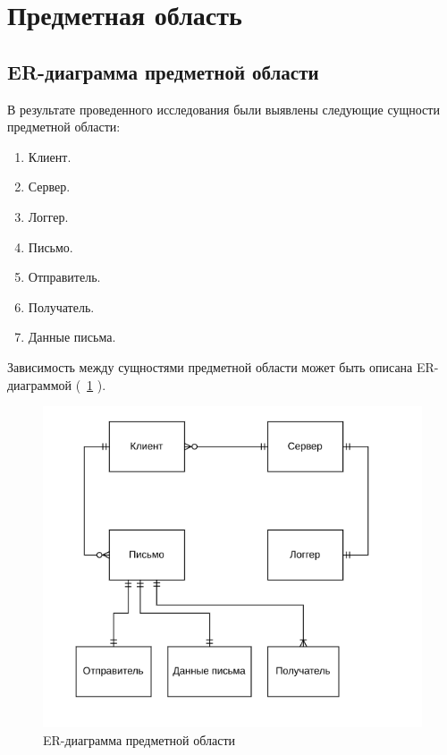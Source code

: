 \documentclass[a4paper,12pt]{report}
\begin{document}
\section{Предметная область}

\subsection{ER-диаграмма предметной области}

В результате проведенного исследования были выявлены следующие сущности предметной области:

\begin{enumerate}
	\item Клиент.
	\item Сервер.
	\item Логгер.
	\item Письмо.
    \item Отправитель.
    \item Получатель.
    \item Данные письма.
\end{enumerate}

Зависимость между сущностями предметной области может быть описана ER-диаграммой (~\ref{fig:er_diagram} ).
\begin{figure}
    \centering
    \includegraphics[width=\textwidth]{../images/er.png}
    \caption{ER-диаграмма предметной области}
    \label{fig:er_diagram}
\end{figure}
\end{document}
